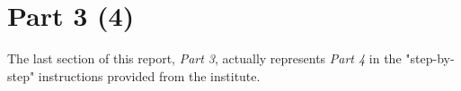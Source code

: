 \newpage
\section{Part 3 (4)}
The last section of this report, \emph{Part 3}, actually represents \emph{Part 4}
in the "step-by-step" instructions provided from the institute.

